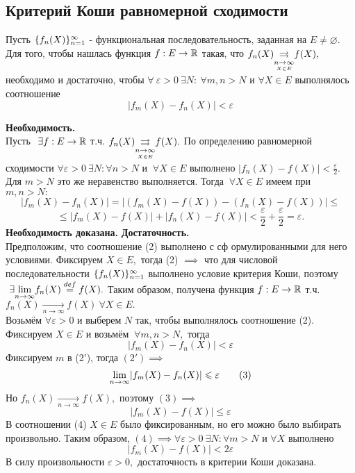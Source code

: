 \documentclass[main]{subfiles}
\begin{document}
\subsection{Критерий Коши равномерной сходимости}
\begin{theorem}
     Пусть $\fnn[f_n(X)]$ - функциональная последовательность, заданная на $E\neq\varnothing.$ 
     Для того, чтобы нашлась функция $f: E\to {\vR}$ такая, что 
     $f_n(X){\darrow{\underset{X\in E}{n\to\infty}}}  f(X),$
      необходимо и достаточно, чтобы $\forall\ \varepsilon>0\ \exists N:\ \forall m, n>N$ и 
      $\forall X\in E$ выполнялось соотношение 
\[ |f_m(X)-f_n(X)|<\varepsilon\tag{2} \] \end{theorem}
\begin{longProof} \textbf{Необходимость.} \\
     Пусть $\ \exists f:E\to{\vR}$ т.ч. $f_n(X){\darrow{\underset{X\in E}{n\to\infty}}}  f(X).$ 
     По определению равномерной сходимости $\forall \varepsilon>0 \ \exists N: \forall n>N$ и $\ \forall X\in E$
      выполнено $|f_n(X)-f(X)|<\frac{\varepsilon}{2}$. Для $m>N$ это же неравенство выполняется.
       Тогда $\ \forall X\in E$ имеем при $m,n>N:$ \[ |f_m(X)-f_n(X)|=|(f_m(X)-f(X))-(f_n(X)-f(X))|\leq\] 
       \[\leq|f_m(X)-f(X)|+|f_n(X)-f(X)|<\frac{\varepsilon}{2}+\frac{\varepsilon}{2}=\varepsilon. \] 
       \textbf{Необходимость доказана.}
\textbf{Достаточность.} \\
Предположим, что соотношение (2) выполнено с сф ормулированными для него условиями. 
Фиксируем $X\in E,$ тогда (2) $\implies$ что для числовой последовательности $\fnn[f_n(X)]$ выполнено условие критерия Коши, поэтому $\ \exists \Lim f_n(X)\overset{def}{=}f(X).$ Таким образом, получена функция $f:E\to {\vR}$ т.ч. $f_n(X)\underset{n\to\infty}{\to} f(X)\ \forall X\in E.$\\
Возьмём $\forall \varepsilon>0$ и выберем $N$ так, чтобы выполнялось соотношение (2). 
Фиксируем $X\in E$ и возьмём $\ \forall m, n>N,$ тогда \[ |f_m(X)-f_n(X)|<\varepsilon \tag{2'} \]
Фиксируем $m$ в (2'), тогда $(2')\implies$ 
\[\Lim |f_m(X)-f_n(X)|\leq\varepsilon\tag{3} \]
Но $f_n(X)\underset{n\to \infty}{\to}f(X),$ поэтому $(3)\implies$
 \[|f_m(X)-f(X)|\leq\varepsilon \tag{4}\]
В соотношении (4) $X\in E$ было фиксированным, но его можно было выбирать произвольно. Таким образом, $(4) \implies \forall\varepsilon>0\ \exists N: \forall m>N$ и $\forall X$ выполнено \[ |f_m(X)-f(X)|<2\varepsilon \]
В силу произвольности $\varepsilon>0,$ достаточность в критерии Коши доказана.
\end{longProof}
\end{document}
